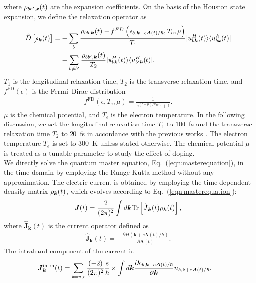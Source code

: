 where $\rho_{bb',\boldsymbol k}(t)$ are the expansion coefficients. On the basis of the Houston state expansion, we define the relaxation operator \cite{sato2019microscopic,PhysRevB.99.214302,sato2019light} as
\begin{align}
    \hat D\left [\rho_{\boldsymbol k}(t) \right ]=&-\sum_{b}\frac{\rho_{bb,\boldsymbol k}(t)-f^{FD}\left
(\epsilon_{b,\boldsymbol k+e\boldsymbol A(t)/\hbar},T_e,\mu \right)}{T_1}|u^H_{b\boldsymbol k}(t)\rangle \langle
u^H_{b\boldsymbol k}(t)|\\ 
                                            &-\sum_{b\neq b'} \frac{\rho_{bb',\boldsymbol k}(t)}{T_2}|u^H_{b\boldsymbol k}(t)\rangle \langle u^H_{b'\boldsymbol k}(t)|,
\label{eqn:relaxation}
\end{align}
$T_1$ is the longitudinal relaxation time, $T_2$ is the transverse relaxation time, and $f^{\mathrm{FD}}(\epsilon)$ is the Fermi--Dirac distribution
\begin{align}
f^{\mathrm{FD}}(\epsilon, T_e, \mu)=\frac{1}{e^{(\epsilon-\mu)/k_BT_e}+1}.
\label{eq:fd-dist}
\end{align}
$\mu$ is the chemical potential, and $T_e$ is the electron temperature.
In the following discussion, we set the longitudinal relaxation time $T_1$ to $100$~fs and the transverse relaxation time $T_2$ to $20$~fs in accordance with the previous works \cite{sato2021nonlinear,sato2021high,sato2019light,sato2019microscopic}. The electron temperature $T_e$ is set to $300$~K unless stated otherwise. The chemical potential $\mu$ is treated as a tunable parameter to study the effect of doping.\\
We directly solve the quantum master equation, Eq.~(\ref{eqn:masterequation}), in the time domain by employing the Runge-Kutta method without any approximation.
The electric current is obtained by employing the time-dependent density matrix $\rho_{\boldsymbol k}(t)$, which evolves according to Eq.~(\ref{eqn:masterequation}):
\begin{eqnarray}
  \boldsymbol{J}(t)=\frac{2}{(2\pi)^2} \int d\boldsymbol k \mathrm{Tr}\left[\hat{\boldsymbol{J}}_{\boldsymbol{k}}(t)\rho_{\boldsymbol{k}}(t)\right],
\label{eqn:totalcurrent}
\end{eqnarray}
where $\hat{\boldsymbol{J}}_{\boldsymbol{k}}(t)$ is the current operator defined as
\begin{align}
\hat{\boldsymbol J}_{\boldsymbol{k}}(t) = -\frac{\partial H(\boldsymbol{k}+e\boldsymbol{A}(t)/\hbar)}{\partial \boldsymbol A(t)}.
\label{totalcurrent}
\end{align}
The intraband component of the current is
\begin{align}
\boldsymbol{J}^{\mathrm{intra}}_{\boldsymbol k}(t)&=\sum_{b=v,c} \frac{(-2)}{(2\pi)^2}
\frac{e}{\hbar} \nonumber \times  
\int d\boldsymbol{k}\frac{\partial\epsilon_{b,\boldsymbol{k}+e\boldsymbol{A}(t)/\hbar}}{\partial\boldsymbol{k}} n_{b,\boldsymbol{k}+e\boldsymbol{A}(t)/\hbar},
\label{eqn:intra-steady-current}
\end{align}
